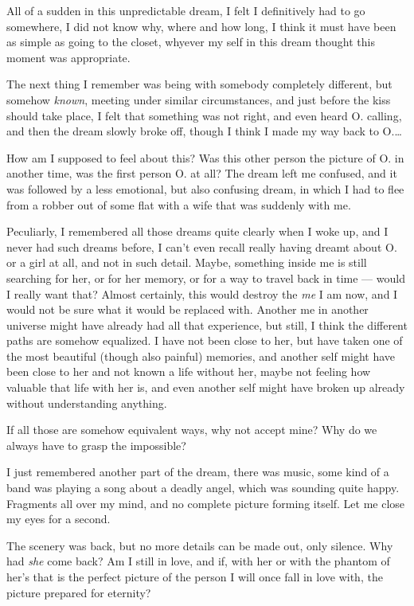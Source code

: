 All of a sudden in this unpredictable dream, I felt I definitively had to go somewhere, I did not know why, where and how long, I think it must have been as simple as going to the closet, whyever my self in this dream thought this moment was appropriate.

The next thing I remember was being with somebody completely different, but somehow \emph{known}, meeting under similar circumstances, and just before the kiss should take place, I felt that something was not right, and even heard O. calling, and then the dream slowly broke off, though I think I made my way back to O.\ldots

How am I supposed to feel about this? Was this other person the picture of O. in another time, was the first person O. at all? The dream left me confused, and it was followed by a less emotional, but also confusing dream, in which I had to flee from a robber out of some flat with a wife that was suddenly with me.

Peculiarly, I remembered all those dreams quite clearly when I woke up, and I never had such dreams before, I can't even recall really having dreamt about O. or a girl at all, and not in such detail. Maybe, something inside me is still searching for her, or for her memory, or for a way to travel back in time --- would I really want that? Almost certainly, this would destroy the \emph{me} I am now, and I would not be sure what it would be replaced with. Another me in another universe might have already had all that experience, but still, I think the different paths are somehow equalized. I have not been close to her, but have taken one of the most beautiful (though also painful) memories, and another self might have been close to her and not known a life without her, maybe not feeling how valuable that life with her is, and even another self might have broken up already without understanding anything.

If all those are somehow equivalent ways, why not accept mine? Why do we always have to grasp the impossible?

I just remembered another part of the dream, there was music, some kind of a band was playing a song about a deadly angel, which was sounding quite happy. Fragments all over my mind, and no complete picture forming itself. Let me close my eyes for a second.

The scenery was back, but no more details can be made out, only silence. Why had \emph{she} come back? Am I still in love, and if, with her or with the phantom of her's that is the perfect picture of the person I will once fall in love with, the picture prepared for eternity?

